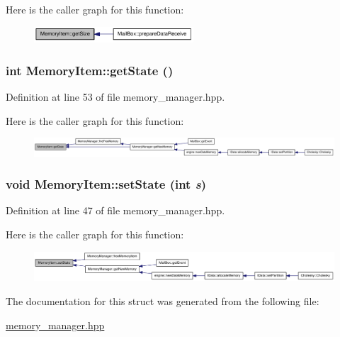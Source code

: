 Here is the caller graph for this function:\nopagebreak
\begin{figure}[H]
\begin{center}
\leavevmode
\includegraphics[width=169pt]{struct_memory_item_a1e478ad1487849ca6da2f5c6250a1580_icgraph}
\end{center}
\end{figure}
\hypertarget{struct_memory_item_ae1fd92ca511fee0daeeac11b301977a6}{
\subsubsection[{getState}]{\setlength{\rightskip}{0pt plus 5cm}int MemoryItem::getState ()}}
\label{struct_memory_item_ae1fd92ca511fee0daeeac11b301977a6}


Definition at line 53 of file memory\_\-manager.hpp.

Here is the caller graph for this function:\nopagebreak
\begin{figure}[H]
\begin{center}
\leavevmode
\includegraphics[width=420pt]{struct_memory_item_ae1fd92ca511fee0daeeac11b301977a6_icgraph}
\end{center}
\end{figure}
\hypertarget{struct_memory_item_ae23ea09a2d3d4d6e311b10b6ce60fd20}{
\subsubsection[{setState}]{\setlength{\rightskip}{0pt plus 5cm}void MemoryItem::setState (int {\em s})}}
\label{struct_memory_item_ae23ea09a2d3d4d6e311b10b6ce60fd20}


Definition at line 47 of file memory\_\-manager.hpp.

Here is the caller graph for this function:\nopagebreak
\begin{figure}[H]
\begin{center}
\leavevmode
\includegraphics[width=420pt]{struct_memory_item_ae23ea09a2d3d4d6e311b10b6ce60fd20_icgraph}
\end{center}
\end{figure}


The documentation for this struct was generated from the following file:\begin{DoxyCompactItemize}
\item 
\hyperlink{memory__manager_8hpp}{memory\_\-manager.hpp}\end{DoxyCompactItemize}
